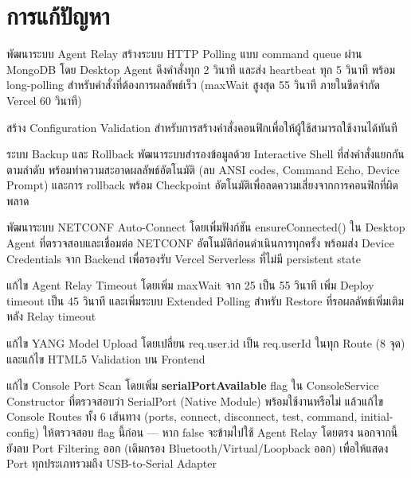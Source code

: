 \section{การแก้ปัญหา}
\begin{mycustomenum}[label=5.3.\arabic*] 
    \item พัฒนาระบบ Agent Relay สร้างระบบ HTTP Polling แบบ command queue ผ่าน MongoDB โดย Desktop Agent ดึงคำสั่งทุก 2 วินาที และส่ง heartbeat ทุก 5 วินาที พร้อม long-polling สำหรับคำสั่งที่ต้องการผลลัพธ์เร็ว (maxWait สูงสุด 55 วินาที ภายในขีดจำกัด Vercel 60 วินาที)
    \item สร้าง Configuration Validation สำหรับการสร้างคำสั่งคอนฟิกเพื่อให้ผู้ใช้สามารถใช้งานได้ทันที
    \item ระบบ Backup และ Rollback พัฒนาระบบสำรองข้อมูลด้วย Interactive Shell ที่ส่งคำสั่งแยกกันตามลำดับ พร้อมทำความสะอาดผลลัพธ์อัตโนมัติ (ลบ ANSI codes, Command Echo, Device Prompt) และการ rollback พร้อม Checkpoint อัตโนมัติเพื่อลดความเสี่ยงจากการคอนฟิกที่ผิดพลาด
    \item พัฒนาระบบ NETCONF Auto-Connect โดยเพิ่มฟังก์ชัน ensureConnected() ใน Desktop Agent ที่ตรวจสอบและเชื่อมต่อ NETCONF อัตโนมัติก่อนดำเนินการทุกครั้ง พร้อมส่ง Device Credentials จาก Backend เพื่อรองรับ Vercel Serverless ที่ไม่มี persistent state
    \item แก้ไข Agent Relay Timeout โดยเพิ่ม maxWait จาก 25 เป็น 55 วินาที เพิ่ม Deploy timeout เป็น 45 วินาที และเพิ่มระบบ Extended Polling สำหรับ Restore ที่รอผลลัพธ์เพิ่มเติมหลัง Relay timeout
    \item แก้ไข YANG Model Upload โดยเปลี่ยน req.user.id เป็น req.userId ในทุก Route (8 จุด) และแก้ไข HTML5 Validation บน Frontend
    \item แก้ไข Console Port Scan โดยเพิ่ม \textbf{serialPortAvailable} flag ใน ConsoleService Constructor ที่ตรวจสอบว่า SerialPort (Native Module) พร้อมใช้งานหรือไม่ แล้วแก้ไข Console Routes ทั้ง 6 เส้นทาง (ports, connect, disconnect, test, command, initial-config) ให้ตรวจสอบ flag นี้ก่อน --- หาก false จะข้ามไปใช้ Agent Relay โดยตรง นอกจากนี้ยังลบ Port Filtering ออก (เดิมกรอง Bluetooth/Virtual/Loopback ออก) เพื่อให้แสดง Port ทุกประเภทรวมถึง USB-to-Serial Adapter
\end{mycustomenum}

